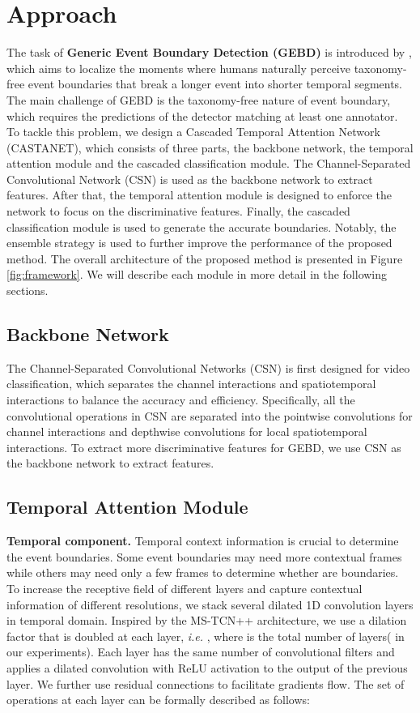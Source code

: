 \documentclass[final]{cvpr}
\begin{document}
\section{Approach}
The task of \textbf{Generic Event Boundary Detection (GEBD)} is introduced by \cite{DBLP:journals/corr/GEBD_dataset}, which aims to localize the moments where humans naturally perceive taxonomy-free event boundaries that break a longer event into shorter temporal segments. The main challenge of GEBD is the taxonomy-free nature of event boundary, which requires the predictions of the detector matching at least one annotator. To tackle this problem, we design a Cascaded Temporal Attention Network (CASTANET), which consists of three parts, the backbone network, the temporal attention module and the cascaded classification module. The Channel-Separated Convolutional Network (CSN) \cite{CSN} is used as the backbone network to extract features. After that, the temporal attention module is designed to enforce the network to focus on the discriminative features. Finally, the cascaded classification module is used to generate the accurate boundaries. Notably, the ensemble strategy is used to further improve the performance of the proposed method. The overall architecture of the proposed method is presented in Figure \ref{fig:framework}. We will describe each module in more detail in the following sections.  

\subsection{Backbone Network}
The Channel-Separated Convolutional Networks (CSN) \cite{CSN} is first designed for video classification, which separates the channel interactions and spatiotemporal interactions to balance the accuracy and efficiency. Specifically, all the convolutional operations in CSN are separated into the pointwise  convolutions for channel interactions and depthwise  convolutions for local spatiotemporal interactions. To extract more discriminative features for GEBD, we use CSN as the backbone network to extract features.

\subsection{Temporal Attention Module}
\noindent\textbf{Temporal component.} Temporal context information is crucial to determine the event boundaries. Some event boundaries may need more contextual frames while others may need only a few frames to determine whether are boundaries. To increase the receptive field of different layers and capture contextual information of different resolutions, we stack several dilated 1D convolution layers in temporal domain. Inspired by the MS-TCN++ \cite{DBLP:journals/corr/MS-TCN++} architecture, we use a dilation factor that is doubled at each layer, \textit{i.e.} , where  is the total number of layers( in our experiments). Each layer has the same number of convolutional filters and applies a dilated convolution with ReLU activation to the output of the previous layer. We further use residual connections to facilitate gradients flow. The set of operations at each layer can be formally described as follows:
\end{document}
